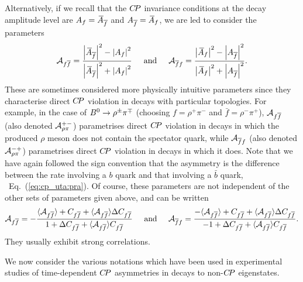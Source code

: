 Alternatively, if we recall that the $C\!P$ invariance
conditions at the decay amplitude level are
$\Af = \Abarfbar$ and $\Afbar = \Abarf$,
we are led to consider the parameters~\cite{Charles:2004jd}
\begin{equation}
  \label{eq:cp_uta:non-cp-directcp}
  {\cal A}_{f\bar{f}} = 
  \frac{
    \left| \Abarfbar \right|^2 - \left| \Af \right|^2 
  }{
    \left| \Abarfbar \right|^2 + \left| \Af \right|^2
  }
  \hspace{5mm}
  {\rm and}
  \hspace{5mm}
  {\cal A}_{\bar{f}f} = 
  \frac{
    \left| \Abarf \right|^2 - \left| \Afbar \right|^2
  }{
    \left| \Abarf \right|^2 + \left| \Afbar \right|^2
  }.
\end{equation}
These are sometimes considered more physically intuitive parameters
since they characterise direct $C\!P$ violation 
in decays with particular topologies.
For example, in the case of $B^0 \to \rho^\pm\pi^\mp$
(choosing $f =  \rho^+\pi^-$ and $\bar{f} = \rho^-\pi^+$),
${\cal A}_{f\bar{f}}$ (also denoted ${\cal A}^{+-}_{\rho\pi}$)
parametrises direct $C\!P$ violation
in decays in which the produced $\rho$ meson does not contain the 
spectator quark,
while ${\cal A}_{\bar{f}f}$ (also denoted ${\cal A}^{-+}_{\rho\pi}$)
parametrises direct $C\!P$ violation 
in decays in which it does.
Note that we have again followed the sign convention that the asymmetry 
is the difference between the rate involving a $b$ quark and that
involving a $\bar{b}$ quark, \cf\ Eq.~(\ref{eq:cp_uta:pra}). 
Of course, these parameters are not independent of the 
other sets of parameters given above, and can be written
\begin{equation}
  {\cal A}_{f\bar{f}} =
  - \frac{
    \Adirnoncp + C_{f\bar{f}} + \Adirnoncp \Delta C_{f\bar{f}} 
  }{
    1 + \Delta C_{f\bar{f}} + \Adirnoncp C_{f\bar{f}} 
  }
  \hspace{5mm}
  {\rm and}
  \hspace{5mm}
  {\cal A}_{\bar{f}f} =
  \frac{
    - \Adirnoncp + C_{f\bar{f}} + \Adirnoncp \Delta C_{f\bar{f}} 
  }{
    - 1 + \Delta C_{f\bar{f}} + \Adirnoncp C_{f\bar{f}}  
  }.
\end{equation}
They usually exhibit strong correlations.

We now consider the various notations which have been used 
in experimental studies of
time-dependent $C\!P$ asymmetries in decays to non-$C\!P$ eigenstates.

\label{sec:cp_uta:notations:non_cp:dstard}

